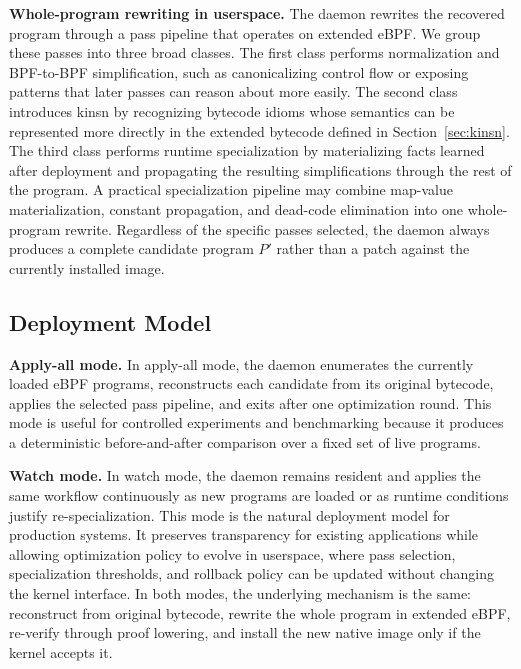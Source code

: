 \noindent\textbf{Whole-program rewriting in userspace.} The daemon rewrites the recovered program through a pass pipeline that operates on extended eBPF. We group these passes into three broad classes. The first class performs normalization and BPF-to-BPF simplification, such as canonicalizing control flow or exposing patterns that later passes can reason about more easily. The second class introduces kinsn by recognizing bytecode idioms whose semantics can be represented more directly in the extended bytecode defined in Section~\ref{sec:kinsn}. The third class performs runtime specialization by materializing facts learned after deployment and propagating the resulting simplifications through the rest of the program. A practical specialization pipeline may combine map-value materialization, constant propagation, and dead-code elimination into one whole-program rewrite. Regardless of the specific passes selected, the daemon always produces a complete candidate program $P'$ rather than a patch against the currently installed image.

\subsection{Deployment Model}
\label{sec:rejit-deployment}

\noindent\textbf{Apply-all mode.} In apply-all mode, the daemon enumerates the currently loaded eBPF programs, reconstructs each candidate from its original bytecode, applies the selected pass pipeline, and exits after one optimization round. This mode is useful for controlled experiments and benchmarking because it produces a deterministic before-and-after comparison over a fixed set of live programs.

\noindent\textbf{Watch mode.} In watch mode, the daemon remains resident and applies the same workflow continuously as new programs are loaded or as runtime conditions justify re-specialization. This mode is the natural deployment model for production systems. It preserves transparency for existing applications while allowing optimization policy to evolve in userspace, where pass selection, specialization thresholds, and rollback policy can be updated without changing the kernel interface. In both modes, the underlying mechanism is the same: reconstruct from original bytecode, rewrite the whole program in extended eBPF, re-verify through proof lowering, and install the new native image only if the kernel accepts it.